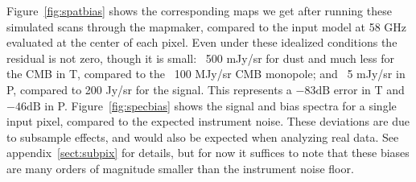 \documentclass{article}
\begin{document}
Figure~\ref{fig:spatbias} shows the
corresponding maps we get after running these simulated scans
through the mapmaker, compared to the input model at 58 GHz
evaluated at the center of each pixel. Even under these idealized
conditions the residual is not zero, though it is small: ~500 mJy/sr for
dust and much less for the CMB in T, compared to the ~100 MJy/sr
CMB monopole; and ~5 mJy/sr in P, compared to 200 Jy/sr for the signal.
This represents a $-83 \textrm{dB}$ error in T and $-46
\textrm{dB}$ in P.
Figure~\ref{fig:specbias} shows the signal and bias spectra for
a single input pixel, compared to the expected instrument noise.
These deviations are due to subsample effects, and would also
be expected when analyzing real data. See appendix~\ref{sect:subpix}
for details, but for now it suffices to note that these biases
are many orders of magnitude smaller than the instrument noise floor.
\end{document}
